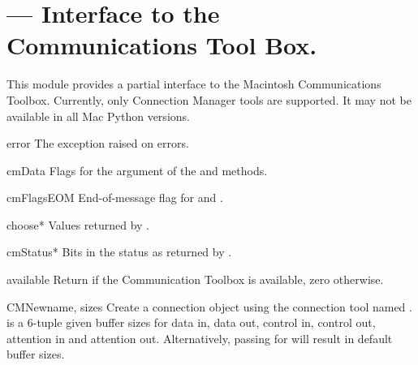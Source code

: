 \section{ ---
         Interface to the Communications Tool Box.}



This module provides a partial interface to the Macintosh
Communications Toolbox. Currently, only Connection Manager tools are
supported.  It may not be available in all Mac Python versions.

\begin{datadesc}{error}
The exception raised on errors.
\end{datadesc}

\begin{datadesc}{cmData}
Flags for the  argument of the  and
 methods.
\end{datadesc}

\begin{datadesc}{cmFlagsEOM}
End-of-message flag for  and .
\end{datadesc}

\begin{datadesc}{choose*}
Values returned by .
\end{datadesc}

\begin{datadesc}{cmStatus*}
Bits in the status as returned by .
\end{datadesc}

\begin{funcdesc}{available}{}
Return  if the Communication Toolbox is available, zero otherwise.
\end{funcdesc}

\begin{funcdesc}{CMNew}{name, sizes}
Create a connection object using the connection tool named
.  is a 6-tuple given buffer sizes for data in,
data out, control in, control out, attention in and attention out.
Alternatively, passing  for  will result in
default buffer sizes.
\end{funcdesc}

